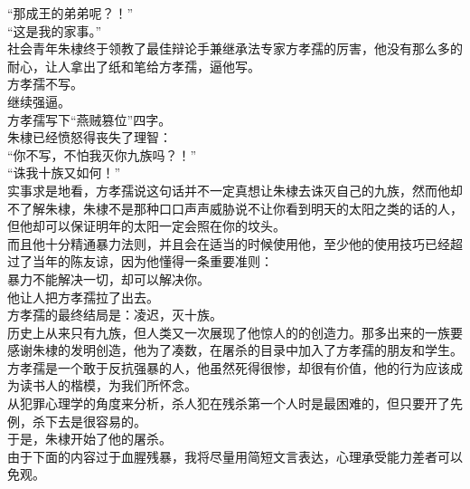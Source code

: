 \begin{multicols}{\theparacolNo}
“那成王的弟弟呢？！”\\

“这是我的家事。”\\

社会青年朱棣终于领教了最佳辩论手兼继承法专家方孝孺的厉害，他没有那么多的耐心，让人拿出了纸和笔给方孝孺，逼他写。\\

方孝孺不写。\\

继续强逼。\\

方孝孺写下“燕贼篡位”四字。\\

朱棣已经愤怒得丧失了理智：\\

“你不写，不怕我灭你九族吗？！”\\

“诛我十族又如何！”\\

实事求是地看，方孝孺说这句话并不一定真想让朱棣去诛灭自己的九族，然而他却不了解朱棣，朱棣不是那种口口声声威胁说不让你看到明天的太阳之类的话的人，但他却可以保证明年的太阳一定会照在你的坟头。\\

而且他十分精通暴力法则，并且会在适当的时候使用他，至少他的使用技巧已经超过了当年的陈友谅，因为他懂得一条重要准则：\\

暴力不能解决一切，却可以解决你。\\

他让人把方孝孺拉了出去。\\

方孝孺的最终结局是：凌迟，灭十族。\\

历史上从来只有九族，但人类又一次展现了他惊人的的创造力。那多出来的一族要感谢朱棣的发明创造，他为了凑数，在屠杀的目录中加入了方孝孺的朋友和学生。\\

方孝孺是一个敢于反抗强暴的人，他虽然死得很惨，却很有价值，他的行为应该成为读书人的楷模，为我们所怀念。\\

从犯罪心理学的角度来分析，杀人犯在残杀第一个人时是最困难的，但只要开了先例，杀下去是很容易的。\\

于是，朱棣开始了他的屠杀。\\

由于下面的内容过于血腥残暴，我将尽量用简短文言表达，心理承受能力差者可以免观。\\


\end{multicols}
